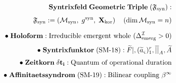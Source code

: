 \documentclass[preview]{standalone}
\begin{document}
\begin{align*}
\special{dvisvgm:raw <g id='unique000'>}\mathbf{Syntrixfeld\;Geometric\;Triple\;(\mathfrak{F}_{\text{syn}}):}\\[4pt]\mathfrak{F}_{\text{syn}} := \left(\mathcal{M}_{\text{syn}},\; g^{\text{syn}},\; \mathbf{X}_{\text{kor}}\right)\quad(\dim\mathcal{M}_{\text{syn}}=n)\\[6pt]\bullet\;\mathbf{Holoform:}\;\text{Irreducible emergent whole }(\Delta_{\text{emerg}}^{\mathcal{I}}>0)\\[3pt]\bullet\;\mathbf{Syntrixfunktor\;(\text{SM-18}):}\;\widetilde{F}|,(\widetilde{a}_\varsigma)_1^r,\overline{||}_A,\widetilde{A}\\[3pt]\bullet\;\mathbf{Zeitkorn\;\delta t_i:}\;\text{Quantum of operational duration}\\[3pt]\bullet\;\mathbf{Affinitaetssyndrom\;(\text{SM-19}):}\;\text{Bilinear coupling }\beta^\infty\special{dvisvgm:raw </g>}
\end{align*}
\end{document}
